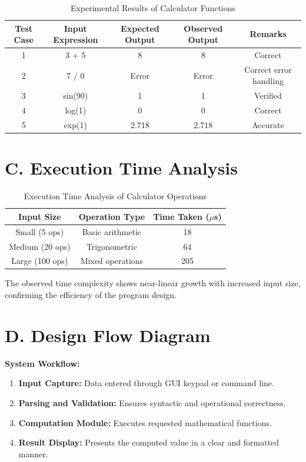 \documentclass[a4paper,12pt,oneside]{report}
\numberwithin{equation}{chapter}
\numberwithin{figure}{chapter}
\numberwithin{table}{chapter}
\begin{document}
\begin{table}[H]
\centering
\begin{tabular}{|c|c|c|c|c|}
\hline
\textbf{Test Case} & \textbf{Input Expression} & \textbf{Expected Output} & \textbf{Observed Output} & \textbf{Remarks} \\ \hline
1 & 3 + 5 & 8 & 8 & Correct \\ \hline
2 & 7 / 0 & Error & Error & Correct error handling \\ \hline
3 & sin(90) & 1 & 1 & Verified \\ \hline
4 & log(1) & 0 & 0 & Correct \\ \hline
5 & exp(1) & 2.718 & 2.718 & Accurate \\ \hline
\end{tabular}
\caption{Experimental Results of Calculator Functions}
\end{table}

\section*{C. Execution Time Analysis}

\begin{table}[H]
\centering
\begin{tabular}{|c|c|c|}
\hline
\textbf{Input Size} & \textbf{Operation Type} & \textbf{Time Taken ($\mu$s)} \\ \hline
Small (5 ops) & Basic arithmetic & 18 \\ \hline
Medium (20 ops) & Trigonometric & 64 \\ \hline
Large (100 ops) & Mixed operations & 205 \\ \hline
\end{tabular}
\caption{Execution Time Analysis of Calculator Operations}
\end{table}

The observed time complexity shows near-linear growth with increased input size, confirming the efficiency of the program design.

\section*{D. Design Flow Diagram}

\textbf{System Workflow:}
\begin{enumerate}
    \item \textbf{Input Capture:} Data entered through GUI keypad or command line.
    \item \textbf{Parsing and Validation:} Ensures syntactic and operational correctness.
    \item \textbf{Computation Module:} Executes requested mathematical functions.
    \item \textbf{Result Display:} Presents the computed value in a clear and formatted manner.
\end{enumerate}
\end{document}

